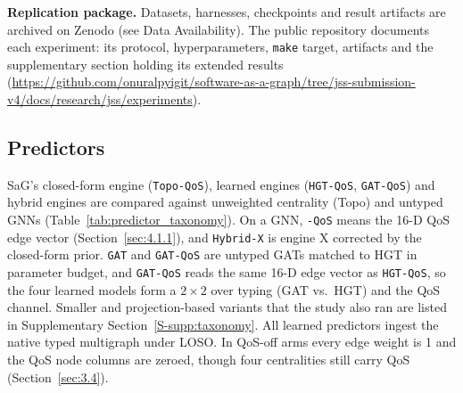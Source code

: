 \documentclass[preprint,3p]{elsarticle}
\newcommand{\sagexperimentsurl}{https://github.com/onuralpyigit/software-as-a-graph/tree/jss-submission-v4/docs/research/jss/experiments}
\newcommand{\sagexperiments}{\url{\sagexperimentsurl}}
\begin{document}
\noindent\textbf{Replication package.} Datasets, harnesses, checkpoints and result artifacts are archived on Zenodo (see Data Availability). The public repository documents each experiment: its protocol, hyperparameters, \texttt{make} target, artifacts and the supplementary section holding its extended results (\sagexperiments).

\subsection{Predictors}
\label{sec:6.2}

SaG's closed-form engine (\texttt{Topo-QoS}), learned engines (\texttt{HGT-QoS}, \texttt{GAT-QoS}) and hybrid engines are compared against unweighted centrality (Topo) and untyped GNNs (Table~\ref{tab:predictor_taxonomy}). On a GNN, \texttt{-QoS} means the 16-D QoS edge vector (Section~\ref{sec:4.1.1}), and \texttt{Hybrid-X} is engine X corrected by the closed-form prior. \texttt{GAT} and \texttt{GAT-QoS} are untyped GATs matched to HGT in parameter budget, and \texttt{GAT-QoS} reads the same 16-D edge vector as \texttt{HGT-QoS}, so the four learned models form a $2\times2$ over typing (GAT vs.\ HGT) and the QoS channel. Smaller and projection-based variants that the study also ran are listed in Supplementary Section~\ref{S-supp:taxonomy}. All learned predictors ingest the native typed multigraph under LOSO. In QoS-off arms every edge weight is 1 and the QoS node columns are zeroed, though four centralities still carry QoS (Section~\ref{sec:3.4}).
\end{document}
